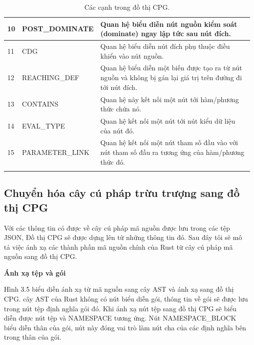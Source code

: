 \begin{longtable}{| p{} | p{} | p{} |}
10 & POST\_DOMINATE  & Quan hệ biểu diễn nút nguồn kiểm soát (dominate) ngay lập tức sau nút đích.                                                                                                                                  \\ \hline
11 & CDG            & Quan hệ biểu diễn nút đích phụ thuộc điều khiển vào nút nguồn.                                                                                                                                               \\ \hline
12 & REACHING\_DEF   & Quan hệ biểu diễn một biến được tạo ra từ nút nguồn và không bị gán lại giá trị trên đường đi tới nút đích.                                                                                                  \\ \hline
13 & CONTAINS       & Quan hệ này kết nối một nút tới hàm/phương thức chứa nó.                                                                                                                                                     \\ \hline
14 & EVAL\_TYPE      & Quan hệ kết nối một nút tới nút kiểu dữ liệu của nút đó.                                                                                                                                                     \\ \hline
15 & PARAMETER\_LINK & Quan hệ kết nối một nút tham số đầu vào với nút tham số đầu ra tương ứng của hàm/phương thức đó.                                                                                                             \\ \hline
\caption{Các cạnh trong đồ thị CPG.}
\label{table:c3_edgecpgjoern}
\end{longtable}
\medskip

\subsection{Chuyển hóa cây cú pháp trừu trượng sang đồ thị CPG}

Với các thông tin có được về cây cú pháp mã nguồn được lưu trong các tệp JSON,
Đồ thị CPG sẽ được dựng lên từ những thông tin đó.
Sau đây tôi sẽ mô tả việc ánh xạ các thành phần mã nguồn chính của Rust từ cây cú pháp mã nguồn sang đồ thị CPG.

\textbf{Ánh xạ tệp  và gói}

Hình 3.5 biểu diễn ánh xạ từ mã nguồn sang cây AST và ánh xạ sang đồ thị CPG.
cây AST của Rust không có nút biểu diễn gói, thông tin về gói sẽ được lưu trong nút tệp định nghĩa gói đó.
Khi ánh xạ nút tệp sang đồ thị CPG sẽ biểu diễn được nút tệp và NAMESPACE tương ứng.
Nút NAMESPACE\_BLOCK biểu diễn thân của gói, nút này đóng vai trò làm nút cha của các định nghĩa bên trong thân của gói.
